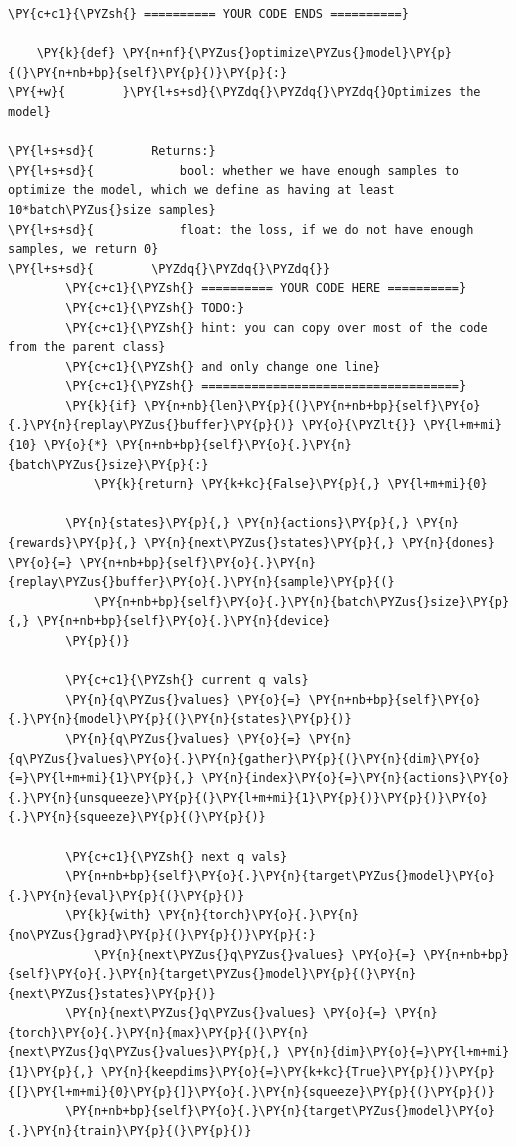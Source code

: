 \documentclass{article}
\begin{document}
\begin{Verbatim}[commandchars=\\\{\}]
        \PY{c+c1}{\PYZsh{} ========== YOUR CODE ENDS ==========}

    \PY{k}{def} \PY{n+nf}{\PYZus{}optimize\PYZus{}model}\PY{p}{(}\PY{n+nb+bp}{self}\PY{p}{)}\PY{p}{:}
\PY{+w}{        }\PY{l+s+sd}{\PYZdq{}\PYZdq{}\PYZdq{}Optimizes the model}

\PY{l+s+sd}{        Returns:}
\PY{l+s+sd}{            bool: whether we have enough samples to optimize the model, which we define as having at least 10*batch\PYZus{}size samples}
\PY{l+s+sd}{            float: the loss, if we do not have enough samples, we return 0}
\PY{l+s+sd}{        \PYZdq{}\PYZdq{}\PYZdq{}}
        \PY{c+c1}{\PYZsh{} ========== YOUR CODE HERE ==========}
        \PY{c+c1}{\PYZsh{} TODO:}
        \PY{c+c1}{\PYZsh{} hint: you can copy over most of the code from the parent class}
        \PY{c+c1}{\PYZsh{} and only change one line}
        \PY{c+c1}{\PYZsh{} ====================================}
        \PY{k}{if} \PY{n+nb}{len}\PY{p}{(}\PY{n+nb+bp}{self}\PY{o}{.}\PY{n}{replay\PYZus{}buffer}\PY{p}{)} \PY{o}{\PYZlt{}} \PY{l+m+mi}{10} \PY{o}{*} \PY{n+nb+bp}{self}\PY{o}{.}\PY{n}{batch\PYZus{}size}\PY{p}{:}
            \PY{k}{return} \PY{k+kc}{False}\PY{p}{,} \PY{l+m+mi}{0}

        \PY{n}{states}\PY{p}{,} \PY{n}{actions}\PY{p}{,} \PY{n}{rewards}\PY{p}{,} \PY{n}{next\PYZus{}states}\PY{p}{,} \PY{n}{dones} \PY{o}{=} \PY{n+nb+bp}{self}\PY{o}{.}\PY{n}{replay\PYZus{}buffer}\PY{o}{.}\PY{n}{sample}\PY{p}{(}
            \PY{n+nb+bp}{self}\PY{o}{.}\PY{n}{batch\PYZus{}size}\PY{p}{,} \PY{n+nb+bp}{self}\PY{o}{.}\PY{n}{device}
        \PY{p}{)}

        \PY{c+c1}{\PYZsh{} current q vals}
        \PY{n}{q\PYZus{}values} \PY{o}{=} \PY{n+nb+bp}{self}\PY{o}{.}\PY{n}{model}\PY{p}{(}\PY{n}{states}\PY{p}{)}
        \PY{n}{q\PYZus{}values} \PY{o}{=} \PY{n}{q\PYZus{}values}\PY{o}{.}\PY{n}{gather}\PY{p}{(}\PY{n}{dim}\PY{o}{=}\PY{l+m+mi}{1}\PY{p}{,} \PY{n}{index}\PY{o}{=}\PY{n}{actions}\PY{o}{.}\PY{n}{unsqueeze}\PY{p}{(}\PY{l+m+mi}{1}\PY{p}{)}\PY{p}{)}\PY{o}{.}\PY{n}{squeeze}\PY{p}{(}\PY{p}{)}

        \PY{c+c1}{\PYZsh{} next q vals}
        \PY{n+nb+bp}{self}\PY{o}{.}\PY{n}{target\PYZus{}model}\PY{o}{.}\PY{n}{eval}\PY{p}{(}\PY{p}{)}
        \PY{k}{with} \PY{n}{torch}\PY{o}{.}\PY{n}{no\PYZus{}grad}\PY{p}{(}\PY{p}{)}\PY{p}{:}
            \PY{n}{next\PYZus{}q\PYZus{}values} \PY{o}{=} \PY{n+nb+bp}{self}\PY{o}{.}\PY{n}{target\PYZus{}model}\PY{p}{(}\PY{n}{next\PYZus{}states}\PY{p}{)}
        \PY{n}{next\PYZus{}q\PYZus{}values} \PY{o}{=} \PY{n}{torch}\PY{o}{.}\PY{n}{max}\PY{p}{(}\PY{n}{next\PYZus{}q\PYZus{}values}\PY{p}{,} \PY{n}{dim}\PY{o}{=}\PY{l+m+mi}{1}\PY{p}{,} \PY{n}{keepdims}\PY{o}{=}\PY{k+kc}{True}\PY{p}{)}\PY{p}{[}\PY{l+m+mi}{0}\PY{p}{]}\PY{o}{.}\PY{n}{squeeze}\PY{p}{(}\PY{p}{)}
        \PY{n+nb+bp}{self}\PY{o}{.}\PY{n}{target\PYZus{}model}\PY{o}{.}\PY{n}{train}\PY{p}{(}\PY{p}{)}


\end{Verbatim}
\end{document}
